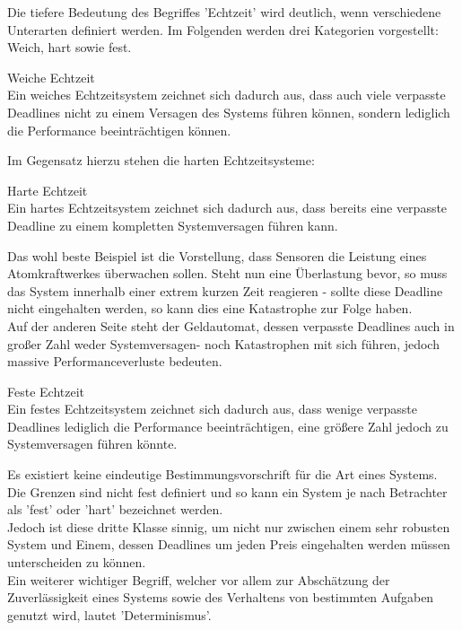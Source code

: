 Die tiefere Bedeutung des Begriffes 'Echtzeit' wird deutlich, wenn verschiedene Unterarten definiert werden. Im Folgenden werden drei Kategorien vorgestellt: Weich, hart sowie fest.\\
\begin{definition}{Weiche Echtzeit}\\
Ein weiches Echtzeitsystem zeichnet sich dadurch aus, dass auch viele verpasste Deadlines nicht zu einem Versagen des Systems führen können, sondern lediglich die Performance beeinträchtigen können.
\end{definition}
Im Gegensatz hierzu stehen die harten Echtzeitsysteme:\\
\begin{definition}{Harte Echtzeit}\\
Ein hartes Echtzeitsystem zeichnet sich dadurch aus, dass bereits eine verpasste Deadline zu einem kompletten Systemversagen führen kann.
\end{definition}
Das wohl beste Beispiel ist die Vorstellung, dass Sensoren die Leistung eines Atomkraftwerkes überwachen sollen. Steht nun eine Überlastung bevor, so muss das System innerhalb einer extrem kurzen Zeit reagieren - sollte diese Deadline nicht eingehalten werden, so kann dies eine Katastrophe zur Folge haben.\\
Auf der anderen Seite steht der Geldautomat, dessen verpasste Deadlines auch in großer Zahl weder Systemversagen- noch Katastrophen mit sich führen, jedoch massive Performanceverluste bedeuten.\\
\begin{definition}{Feste Echtzeit}\\
Ein festes Echtzeitsystem zeichnet sich dadurch aus, dass wenige verpasste Deadlines lediglich die Performance beeinträchtigen, eine größere Zahl jedoch zu Systemversagen führen könnte.
\end{definition}
Es existiert keine eindeutige Bestimmungsvorschrift für die Art eines Systems. Die Grenzen sind nicht fest definiert und so kann ein System je nach Betrachter als 'fest' oder 'hart' bezeichnet werden.\\
Jedoch ist diese dritte Klasse sinnig, um nicht nur zwischen einem sehr robusten System und Einem,
dessen Deadlines um jeden Preis eingehalten werden müssen unterscheiden zu können.\\
Ein weiterer wichtiger Begriff, welcher vor allem zur Abschätzung der Zuverlässigkeit eines Systems sowie des Verhaltens von bestimmten Aufgaben genutzt wird, lautet 'Determinismus'.\\
